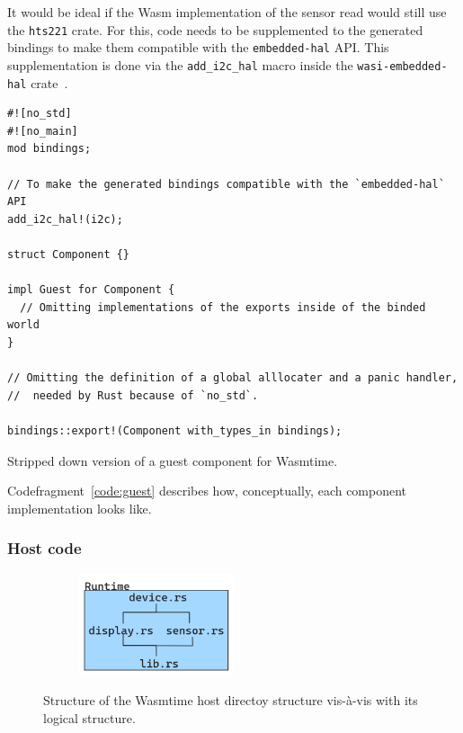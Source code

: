 It would be ideal if the \gls{Wasm} implementation of the sensor read would still use the \texttt{hts221} crate. For this, code needs to be supplemented to the generated bindings to make them compatible with the \texttt{embedded-hal} API. This supplementation is done via the \texttt{add\_i2c\_hal} macro inside the \texttt{wasi-embedded-hal} crate~\cite{gh:weh}.

\begin{listing}[h]
\begin{verbatim}
#![no_std]
#![no_main]
mod bindings;

// To make the generated bindings compatible with the `embedded-hal` API
add_i2c_hal!(i2c);

struct Component {}

impl Guest for Component {
  // Omitting implementations of the exports inside of the binded world
}

// Omitting the definition of a global alllocater and a panic handler,
//  needed by Rust because of `no_std`.

bindings::export!(Component with_types_in bindings);
\end{verbatim}
\caption{Stripped down version of a guest component for Wasmtime.}
\label{code:guest}
\end{listing}

Codefragment~\ref{code:guest} describes how, conceptually, each component implementation looks like.

\subsubsection{Host code}

\begin{figure}[h]
\begin{subfigure}{.5\textwidth}
\end{subfigure}%
\begin{subfigure}{.5\textwidth}
    \centering
    \includegraphics[width=0.5\textwidth]{figures/host.png}
\end{subfigure}
\caption{Structure of the Wasmtime host directoy structure vis-à-vis with its logical structure.}
\label{fig:host}
\end{figure}

